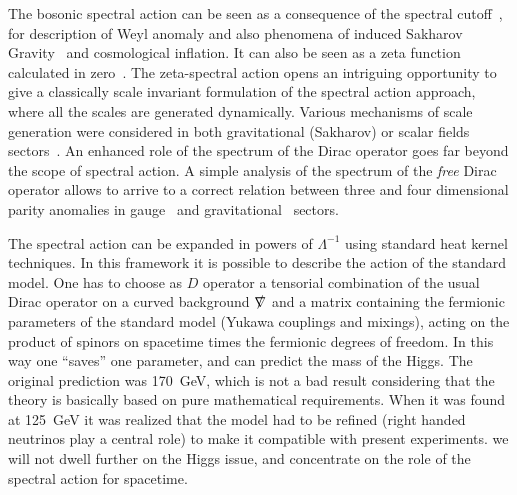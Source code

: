 \documentclass[12pt,a4paper]{article}
\begin{document}
The bosonic spectral action can be seen as a consequence of the spectral cutoff~\cite{Andrianov:2010nr,Andrianov:2011bc,Kurkov:2012dn}, for description of Weyl anomaly and also phenomena of induced Sakharov Gravity~\cite{Sakharov} and cosmological inflation\cite{Kurkov:2013gma}. It can also be seen as a zeta function calculated in zero~\cite{zeta}. The zeta-spectral action opens an intriguing opportunity to give a classically scale invariant formulation of the spectral action approach, where all the scales are generated dynamically.  Various mechanisms of scale generation were considered in both gravitational (Sakharov) or scalar fields sectors~\cite{ripples}. An enhanced role of the spectrum of the Dirac operator goes  far beyond the scope of spectral action. A simple analysis of the spectrum of the \emph{free} Dirac operator allows to arrive to a correct relation between three and four dimensional parity anomalies in gauge~\cite{Kurkov:2017cdz} and gravitational~\cite{Kurkov:2018pjw} sectors.





The spectral action can be expanded in powers of $\Lambda^{-1}$ using standard heat kernel techniques.
In this framework it is possible to describe the action of the standard model.
One has to choose as $D$ operator a tensorial combination of the usual Dirac operator on a curved background  $\slashed\nabla$ and a matrix containing the fermionic parameters of the standard model (Yukawa couplings and mixings), acting on the product of spinors on spacetime times the fermionic degrees of freedom. In this way one ``saves'' one parameter, and can predict the mass of the Higgs. The original prediction was 170~GeV, which is not a bad result considering that the theory is basically based on pure mathematical requirements. When it was found at 125~GeV it was realized that the model had to be refined (right handed neutrinos play a central role) to make it compatible with present experiments. 
we will not dwell further on the Higgs issue, and concentrate on the role of the spectral action for spacetime.
\end{document}
